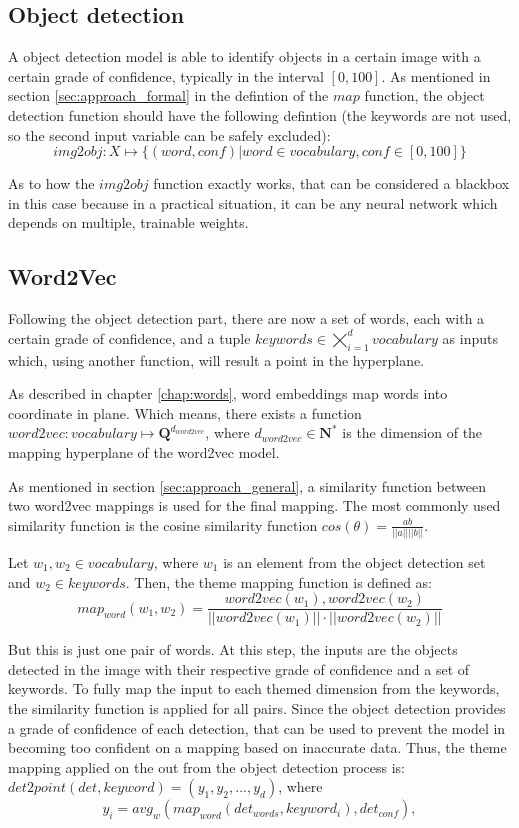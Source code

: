\subsection{Object detection}
\label{subsec:approach_formal_obj}

A object detection model is able to identify objects in a certain image with a certain grade of confidence, typically in the interval $[0, 100]$. As mentioned in section \ref{sec:approach_formal} in the defintion of the $map$ function, the object detection function should have the following defintion (the keywords are not used, so the second input variable can be safely excluded):
$$ img2obj : X \mapsto \{(word, conf) | word \in vocabulary, conf \in [0, 100]\} $$

As to how the $img2obj$ function exactly works, that can be considered a blackbox in this case because in a practical situation, it can be any neural network which depends on multiple, trainable weights.

\subsection{Word2Vec}
\label{subsec:approach_formal_word2vec}

Following the object detection part, there are now a set of words, each with a certain grade of confidence, and a tuple $keywords \in \bigtimes_{i=1}^{d}{vocabulary}$ as inputs which, using another function, will result a point in the hyperplane.

As described in chapter \ref{chap:words}, word embeddings map words into coordinate in plane. Which means, there exists a function $word2vec : vocabulary \mapsto \mathbf{Q}^{d_{word2vec}} $, where $d_{word2vec} \in \mathbf{N^{*}}$ is the dimension of the mapping hyperplane of the word2vec model.

As mentioned in section \ref{sec:approach_general}, a similarity function between two word2vec mappings is used for the final mapping. The most commonly used similarity function is the cosine similarity function $cos(\theta) = \frac{a b}{|| a || || b ||} $. 

Let $w_1, w_2 \in vocabulary$, where $w_1$ is an element from the object detection set and $w_2 \in keywords$. Then, the theme mapping function is defined as:
$$ map_{word}(w_1, w_2) =  \frac{word2vec(w_1), word2vec(w_2)}{|| word2vec(w_1) || \cdot || word2vec(w_2) ||} $$

But this is just one pair of words. At this step, the inputs are the objects detected in the image with their respective grade of confidence and a set of keywords. To fully map the input to each themed dimension from the keywords, the similarity function is applied for all pairs. Since the object detection provides a grade of confidence of each detection, that can be used to prevent the model in becoming too confident on a mapping based on inaccurate data. Thus, the theme mapping applied on the out from the object detection process is: $ det2point(det, keyword) = (y_1, y_2, ..., y_d) $, where 
$$ y_i = avg_{w}(map_{word} (det_{words}, keyword_i) , det_{conf} ) ,$$

